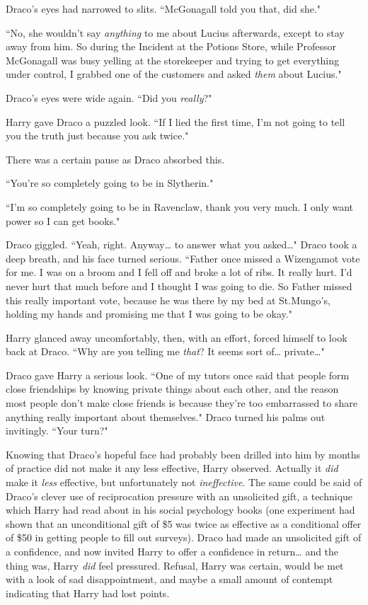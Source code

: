 Draco's eyes had narrowed to slits. ``McGonagall told you that, did she."

``No, she wouldn't say \emph{anything} to me about Lucius afterwards, except to stay away from him. So during the Incident at the Potions Store, while Professor McGonagall was busy yelling at the storekeeper and trying to get everything under control, I grabbed one of the customers and asked \emph{them} about Lucius."

Draco's eyes were wide again. ``Did you \emph{really}?"

Harry gave Draco a puzzled look. ``If I lied the first time, I'm not going to tell you the truth just because you ask twice."

There was a certain pause as Draco absorbed this.

``You're so completely going to be in Slytherin."

``I'm so completely going to be in Ravenclaw, thank you very much. I only want power so I can get books."

Draco giggled. ``Yeah, right. Anyway{\ldots} to answer what you asked{\ldots}" Draco took a deep breath, and his face turned serious. ``Father once missed a Wizengamot vote for me. I was on a broom and I fell off and broke a lot of ribs. It really hurt. I'd never hurt that much before and I thought I was going to die. So Father missed this really important vote, because he was there by my bed at St.\?Mungo's, holding my hands and promising me that I was going to be okay."

Harry glanced away uncomfortably, then, with an effort, forced himself to look back at Draco. ``Why are you telling me \emph{that}? It seems sort of{\ldots} private{\ldots}"

Draco gave Harry a serious look. ``One of my tutors once said that people form close friendships by knowing private things about each other, and the reason most people don't make close friends is because they're too embarrassed to share anything really important about themselves." Draco turned his palms out invitingly. ``Your turn?"

Knowing that Draco's hopeful face had probably been drilled into him by months of practice did not make it any less effective, Harry observed. Actually it \emph{did} make it \emph{less} effective, but unfortunately not \emph{ineffective}. The same could be said of Draco's clever use of reciprocation pressure with an unsolicited gift, a technique which Harry had read about in his social psychology books (one experiment had shown that an unconditional gift of \$5 was twice as effective as a conditional offer of \$50 in getting people to fill out surveys). Draco had made an unsolicited gift of a confidence, and now invited Harry to offer a confidence in return{\ldots} and the thing was, Harry \emph{did} feel pressured. Refusal, Harry was certain, would be met with a look of sad disappointment, and maybe a small amount of contempt indicating that Harry had lost points.

